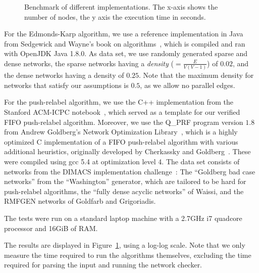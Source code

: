 \documentclass[smallcondensed]{svjour3}     %
\begin{document}
\begin{figure}[!h]
\begin{center}
\end{center}
\caption{Benchmark of different implementations. The x-axis shows the number of nodes, the y axis the execution time in seconds.}\label{fig:benchmark}
\end{figure}

  
  
  For the Edmonds-Karp algorithm, we use a reference implementation in Java from Sedgewick and Wayne's book on algorithms~\cite{SeWa11}, which 
  is compiled and ran with OpenJDK Java 1.8.0.
  As data set, we use randomly generated sparse and dense networks, the sparse networks having a \emph{density} (${} = \frac{E}{V(V - 1)}$) of $0.02$, and the dense networks having a density of $0.25$. Note that the maximum density for networks that satisfy our assumptions is $0.5$, as we allow no parallel edges.
  
  For the push-relabel algorithm, we use the C++ implementation from the Stanford ACM-ICPC notebook~\cite{ICPC-notebook}, which served as 
  a template for our verified FIFO push-relabel algorithm. Moreover, we use the Q\_PRF program 
  version $1.8$ from Andrew Goldberg's Network Optimization Library~\cite{Gold_Network_Opt}, which is a highly optimized C implementation of a FIFO push-relabel 
  algorithm with various additional heuristics, originally developed by Cherkassky and Goldberg~\cite{ChGo97}. 
  These were compiled using gcc 5.4 at optimization level 4.
  The data set consists of networks from the DIMACS implementation challenge~\cite{JGC93}: 
  The ``Goldberg bad case networks'' from the ``Washington'' generator, which are tailored to be hard for push-relabel algorithms, 
  the ``fully dense acyclic networks'' of Waissi, and the RMFGEN networks of Goldfarb and Grigoriadis. 

  The tests were run on a standard laptop machine with a 2.7GHz i7 quadcore processor and 16GiB of RAM.
  
  The results are displayed in Figure~\ref{fig:benchmark}, using a log-log scale.
  Note that we only measure the time required to run the algorithms themselves, excluding the time required for parsing the input and running the network checker.
  
\end{document}
